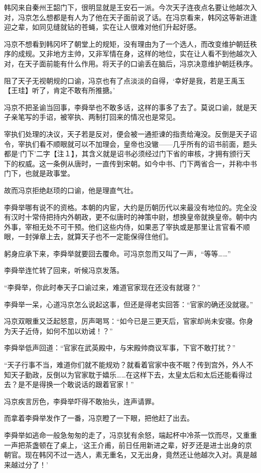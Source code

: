 韩冈来自秦州王韶门下，很明显就是王安石一派。今次天子连夜点名要让他越次入对，冯京怎么想都是有人为了他在天子面前说了话。在冯京看来，韩冈这等新进逢迎之辈，如同见缝就钻的苍蝇，实在让人很难对他们升起好感。

冯京不想看到韩冈坏了朝堂上的规矩，没有理由为了一个选人，而改变维护朝廷秩序的成规。又非地方主帅，又非军情在身，这样的地位，实在让人看不到他越次入对，在天子面前能有什么作用。将天子的口谕丢在脑后，冯京决意维护朝廷秩序。

阻了天子无视朝规的口谕，冯京也有了点淡淡的自得，‘幸好是我，若是王禹玉【王珪】听了，肯定不敢有所推搪。’

冯京不把圣谕当回事，李舜举也不敢多话，这样的事多了去了。莫说口谕，就是天子亲笔写的手诏，被宰执、两制打回来的情况也是常见。

宰执们处理的决议，天子若是反对，便会被一通拒谏的指责给淹没。反倒是天子诏令，宰执们看不顺眼就可以不加理会，皇帝也没辙——几乎所有的诏书前面，题头都是‘门下’二字【注１】，其含义就是诏书必须经过门下省的审核，才拥有颁行天下的权威。这一条例从唐时，一直传到宋朝。如今中书、门下两省合一，并称中书门下，也就是政事堂。

故而冯京拒绝赵顼的口谕，他是理直气壮。

李舜举哪有说不的资格。本朝的内宦，大约是历朝历代以来最没有地位的。完全没有汉时十常侍把持内外朝政，更不似唐时的神策中尉，想换皇帝就换皇帝。朝中内外事，宰相无处不可干预。他们这些内侍，如果恶了宰执或是那里让言官看不顺眼，一封弹章上去，就算天子也不一定能保得住他们。

躬身应承下来，李舜举就要回去覆命。可冯京忽而又叫了一声，“等等……”

李舜举连忙转了回来，听候冯京发落。

“李舜举，你此时奉天子口谕过来，难道官家现在还没有就寝？”

李舜举一呆，心道冯京怎么说起这事，但还是得老实回答：“官家的确还没就寝。”

冯京双眼重又泛起怒意，厉声喝骂：“如今已是三更天后，官家却尚未安寝。你身为天子近侍，如何不加以劝诫！？”

李舜举低声回道：“官家在武英殿中，与宋殿帅商议军事，下官不敢打扰？”

“天子行事不当，难道你们就不能规劝？就看着官家中夜不眠？传到宫外，外人不知天子勤政，反倒以为官家耽于嬉乐……在这样下去，太皇太后和太后还能看得过去？是不是得换一个敢说话的跟着官家！”

冯京疾言厉色，李舜举吓得不敢抬头，连声请罪。

而拿着李舜举发作了一番，冯京瞪了一下眼，把他赶了出去。

李舜举如逃命一般急匆匆的走了，冯京犹有余怒，端起杯中冷茶一饮而尽，又重重一声把茶盏顿在了桌上，‘这王介甫，前日任用新进之辈，好歹还是进士出身的京朝官。现在韩冈不过一选人，素无重名，又无出身，竟然还让他越次入对。真是越来越过分了！’

